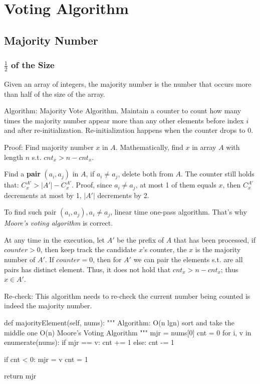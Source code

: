 \section{Voting Algorithm}
\subsection{Majority Number}
\subsubsection{$\frac{1}{2}$ of the Size}
Given an array of integers, the majority number is the number that occurs more than half of the size of the array. 

Algorithm: Majority Vote Algorithm. Maintain a counter to count how many times the majority number appear more than any other elements before index $i$ and after re-initialization. Re-initialization happens when the counter drops to 0. 

Proof: Find majority number $x$ in $A$. Mathematically, find $x$ in array $A$ with length $n$ s.t. $cnt_x > n -cnt_x$. 

Find a \textbf{pair} $(a_i, a_j)$ in $A$, if $a_i \neq a_j$, delete both from $A$. The counter  still
holds that: $C^{A'}_x > |A'|-C^{A'}_x$. Proof, since $a_i\neq a_j$, at most 1 of them
equals $x$, then $C^{A'}_x$ decrements at most by 1, $|A'|$ decrements by 2.

To find such pair $(a_i, a_j), a_i\neq a_j$, linear time one-pass algorithm. That's
why \textit{Moore's voting algorithm} is correct.

At any time in the execution, let $A'$ be the prefix of $A$ that has been processed,
if $counter>0$, then keep track the candidate $x$'s counter, the $x$
is the majority number of $A'$.  If $counter =0$, then for $A'$ we can pair the elements
s.t. are all pairs has distinct element. Thus, it does not hold that $cnt_x>n-cnt_x$;
thus $x\in A'$.
 
Re-check: This algorithm needs to re-check the current number being counted is indeed the majority number.    

\begin{python}
def majorityElement(self, nums):
    """
    Algorithm:
    O(n lgn) sort and take the middle one
    O(n) Moore's Voting Algorithm
    """
    mjr = nums[0]
    cnt = 0
    for i, v in enumerate(nums):
        if mjr == v:
            cnt += 1
        else:
            cnt -= 1

        if cnt < 0:
            mjr = v
            cnt = 1

    return mjr

\end{python}
